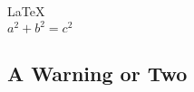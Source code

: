 \documentclass{article}
\begin{document}
               
 
 
\section{}          
\LaTeX \,\\ 
 $a^2+b^2=c^2$

\subsection{A Warning or Two}  

\end{document}
